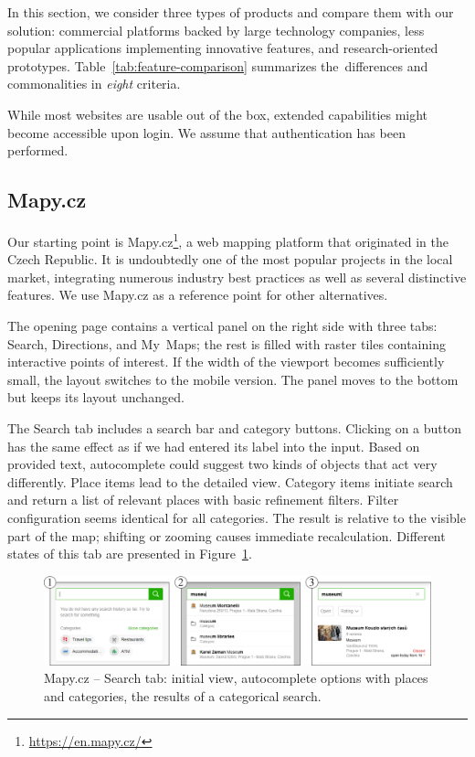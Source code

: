 In this section, we consider three types of products and compare them with our solution: commercial platforms backed by large technology companies, less popular applications implementing innovative features, and research-oriented prototypes. Table~\ref{tab:feature-comparison} summarizes the~differences and commonalities in \emph{eight} criteria.

While most websites are usable out of the box, extended capabilities might become accessible upon login. We assume that authentication has been performed.

\subsection{Mapy.cz}\label{ssec:mapy-cz}

Our starting point is Mapy.cz\footnote{\href{https://en.mapy.cz/}{https://en.mapy.cz/}}, a web mapping platform that originated in the Czech Republic. It is undoubtedly one of the most popular projects in the local market, integrating numerous industry best practices as well as several distinctive features. We use Mapy.cz as a reference point for other alternatives.

The opening page contains a vertical panel on the right side with three tabs: Search, Directions, and My~Maps; the rest is filled with raster tiles containing interactive points of interest. If the width of the viewport becomes sufficiently small, the layout switches to the mobile version. The panel moves to the bottom but keeps its layout unchanged.

The Search tab includes a search bar and category buttons. Clicking on a button has the same effect as if we had entered its label into the input. Based on provided text, autocomplete could suggest two kinds of objects that act very differently. Place items lead to the detailed view. Category items initiate search and return a list of relevant places with basic refinement filters. Filter configuration seems identical for all categories. The result is relative to the visible part of the map; shifting or zooming causes immediate recalculation. Different states of this tab are presented in Figure~\ref{fig:analysis-mapy-cz-search}.

\begin{figure}[!h]
\centering
\includegraphics[width=\linewidth]{img/analysis/mapy-cz-search.png}
\caption{Mapy.cz -- Search tab:  initial view,  autocomplete options with places and categories,  the results of a categorical search.}
\label{fig:analysis-mapy-cz-search}
\end{figure}

